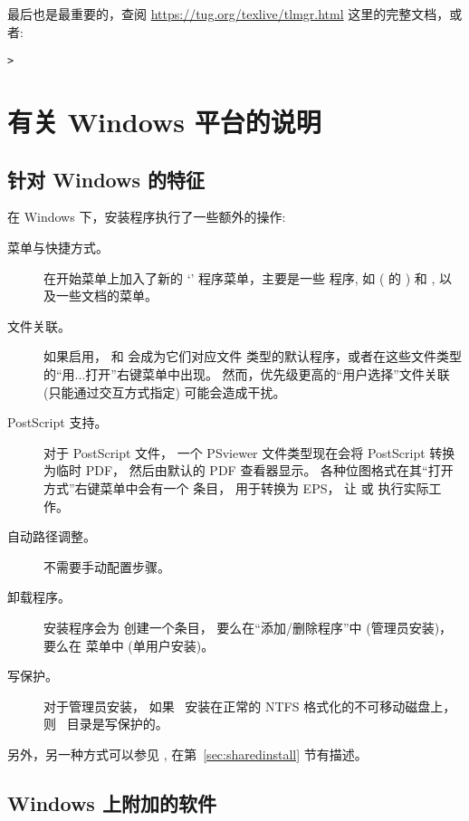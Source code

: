 \documentclass{article}
\begin{document}
最后也是最重要的，查阅 \url{https://tug.org/texlive/tlmgr.html}
这里的完整文档，或者: 
\begin{alltt}
> 
\end{alltt}

\section{有关 Windows 平台的说明}
\label{sec:windows}

\subsection{针对 Windows 的特征}
\label{sec:winfeatures}

在 Windows 下，安装程序执行了一些额外的操作: 
\begin{description}
\item[菜单与快捷方式。] 在开始菜单上加入了新的 `\TL{}' 程序菜单，主要是一些
\GUI{} 程序, 如  ( 的 \GUI) 和 ,
以及一些文档的菜单。

\item[文件关联。] 如果启用， 和  会成为它们对应文件
类型的默认程序，或者在这些文件类型的“用...打开”右键菜单中出现。
然而，优先级更高的“用户选择”文件关联 (只能通过交互方式指定) 可能会造成干扰。

\item[PostScript 支持。] 对于 PostScript 文件，
一个 PSviewer 文件类型现在会将 PostScript 转换为临时 PDF，
然后由默认的 PDF 查看器显示。
各种位图格式在其“打开方式”右键菜单中会有一个  条目，
用于转换为 EPS，
让  或  执行实际工作。

\item[自动路径调整。] 不需要手动配置步骤。

\item[卸载程序。] 安装程序会为 \TL{} 创建一个条目，
要么在“添加/删除程序”中 (管理员安装)，
要么在 \TL{} 菜单中 (单用户安装)。

\item[写保护。] 对于管理员安装，
如果 \TL\ 安装在正常的 NTFS 格式化的不可移动磁盘上，
则 \TL\ 目录是写保护的。
\end{description}

另外，另一种方式可以参见 , 在第~\ref{sec:sharedinstall} 节有描述。

\subsection{Windows 上附加的软件}
\end{document}
